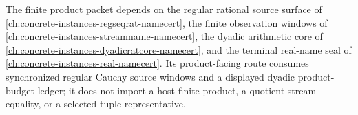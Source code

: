 The finite product packet depends on the regular rational source surface of \autoref{ch:concrete-instances-regseqrat-namecert}, the finite observation windows of \autoref{ch:concrete-instances-streamname-namecert}, the dyadic arithmetic core of \autoref{ch:concrete-instances-dyadicratcore-namecert}, and the terminal real-name seal of \autoref{ch:concrete-instances-real-namecert}. Its product-facing route consumes synchronized regular Cauchy source windows and a displayed dyadic product-budget ledger; it does not import a host finite product, a quotient stream equality, or a selected tuple representative.
